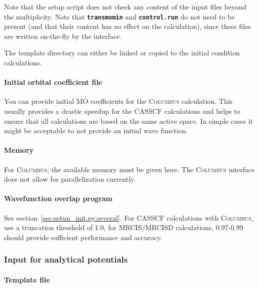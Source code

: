 \documentclass[a4paper,10pt,DIV=15,openany]{scrbook}
\newcommand{\ttt}[1]{\textbf{\texttt{#1}}}
\begin{document}
Note that the setup script does not check any content of the input files beyond the multiplicity. Note that \ttt{transmomin} and \ttt{control.run} do not need to be present (and that their content has no effect on the calculation), since these files are written on-the-fly by the interface. 

The template directory can either be linked or copied to the initial condition calculations.

\paragraph{Initial orbital coefficient file}

You can provide initial MO coefficients for the \textsc{Columbus} calculation. This usually provides a drastic speedup for the CASSCF calculations and helps to ensure that all calculations are based on the same active space. In simple cases it might be acceptable to not provide an initial wave function.

\paragraph{Memory}

For \textsc{Columbus}, the available memory must be given here. The \textsc{Columbus} interface does not allow for parallelization currently.

\paragraph{Wavefunction overlap program}

See section~\ref{sec:setup_init.py:several}. For CASSCF calculations with \textsc{Columbus}, use a truncation threshold of 1.0, for MRCIS/MRCISD calculations, 0.97-0.99 should provide sufficient performance and accuracy.


\subsubsection{Input for analytical potentials}\label{sec:setup_init.py:analytical}

\paragraph{Template file}
\end{document}
